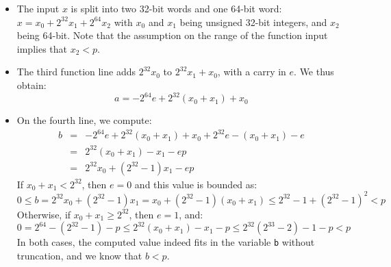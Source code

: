 \documentclass{llncs}
\begin{document}
\begin{itemize}

    \item The input $x$ is split into two 32-bit words and one 64-bit
    word: $x = x_0 + 2^{32} x_1 + 2^{64} x_2$ with $x_0$ and $x_1$
    being unsigned 32-bit integers, and $x_2$ being 64-bit. Note that
    the assumption on the range of the function input implies that
    $x_2 < p$.

    \item The third function line adds $2^{32} x_0$ to
    $2^{32} x_1 + x_0$, with a carry in $e$. We thus obtain:
    \begin{equation*}
        a = -2^{64}e + 2^{32} (x_0 + x_1) + x_0
    \end{equation*}

    \item On the fourth line, we compute:
    \begin{eqnarray*}
        b &=& -2^{64}e + 2^{32} (x_0 + x_1) + x_0 + 2^{32}e - (x_0 + x_1) - e \\
          &=& 2^{32} (x_0 + x_1) - x_1 - ep \\
          &=& 2^{32} x_0 + (2^{32} - 1) x_1 - ep
    \end{eqnarray*}
    If $x_0 + x_1 < 2^{32}$, then $e = 0$ and this value is bounded as:
    \begin{equation*}
        0 \leq b = 2^{32} x_0 + (2^{32} - 1) x_1 = x_0 + (2^{32} - 1)(x_0 + x_1)
        \leq 2^{32} - 1 + (2^{32} - 1)^2 < p
    \end{equation*}
    Otherwise, if $x_0 + x_1 \geq 2^{32}$, then $e = 1$, and:
    \begin{equation*}
        0 = 2^{64} - (2^{32} - 1) - p \leq 2^{32}(x_0 + x_1) - x_1 - p
        \leq 2^{32}(2^{33} - 2) - 1 - p < p
    \end{equation*}
    In both cases, the computed value indeed fits in the variable \verb+b+
    without truncation, and we know that $b < p$.


\end{itemize}
\end{document}
